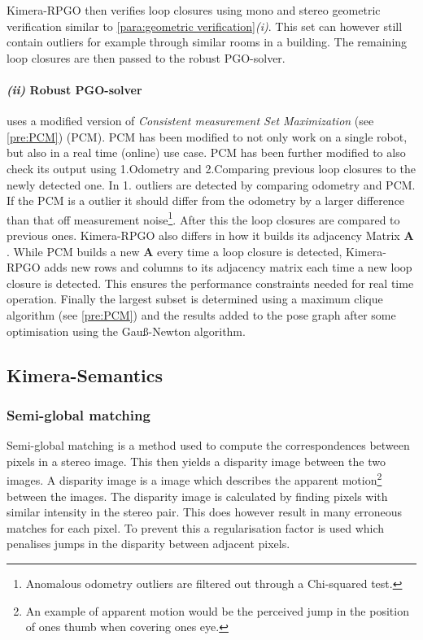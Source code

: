 \documentclass[11pt,a4paper]{article}
\newcommand{\M}[1]{\mathbf{#1}}
\begin{document}
Kimera-RPGO then verifies loop closures using mono and stereo geometric verification similar to \ref{para:geometric verification}\textit{(i)}. This set can however still contain outliers for example through similar rooms in a building.
The remaining loop closures are then passed to the robust PGO-solver.

\paragraph{\textit{(ii)} Robust PGO-solver} uses a modified version of \textit{Consistent measurement Set Maximization} (see \ref{pre:PCM}) (PCM). PCM has been modified to not only work on a single robot, but also in a real time (online) use case.
PCM has been further modified to also check its output using 1.Odometry and 2.Comparing previous loop closures to the newly detected one. 
In 1. outliers are detected by comparing odometry and PCM. 
If the PCM is a outlier it should differ from the odometry by a larger difference than that off measurement noise\footnote{Anomalous odometry outliers are filtered out through a Chi-squared test.}. After this the loop closures are compared to previous ones. 
Kimera-RPGO also differs in how it builds its adjacency Matrix $\M{A}$.
While PCM builds a new $\M{A}$ every time a loop closure is detected, Kimera-RPGO adds new rows and columns to its adjacency matrix each time a new loop closure is detected. This ensures the performance constraints needed for real time operation.
Finally the largest subset is determined using a maximum clique algorithm (see \ref{pre:PCM}) and the results added to the pose graph after some optimisation using the Gauß-Newton algorithm.

\subsection{Kimera-Semantics}
\subsubsection{Semi-global matching} \label{pre:semi-global matching}
Semi-global matching is a method used  to compute the correspondences between pixels in a stereo image. 
This then yields a disparity image between the two images. 
A disparity image is a image which describes the apparent motion\footnote{An example of apparent motion would be the perceived jump in the position of ones thumb when covering ones eye.} between the images.
The disparity image is calculated by finding pixels with similar intensity in the stereo pair. 
This does however result in many erroneous matches for each pixel. 
To prevent this a regularisation factor is used which penalises jumps in the disparity between adjacent pixels.
\end{document}
